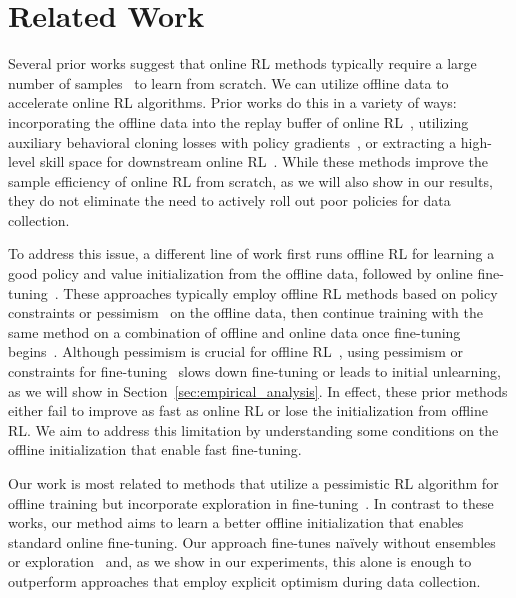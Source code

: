 \vspace{-0.2cm}
\section{Related Work}
\vspace{-0.3cm}
Several prior works suggest that online RL methods typically require a large number of samples~\cite{silver2016mastering,vinyals2019grandmaster,ye2020towards,kakade2002approximately,zhai2022computational,gupta2022unpacking,li2022understanding} to learn from scratch. We can utilize offline data to accelerate online RL algorithms. Prior works do this in a variety of ways: incorporating the offline data into the replay buffer of online RL~\cite{schaal1996learning,vecerik2017leveraging,hester2018deep,song2023hybrid}, utilizing auxiliary behavioral cloning losses with policy gradients~\cite{rajeswaran2017learning,kang2018policy,zhu2018reinforcement,zhu2019dexterous}, or extracting a high-level skill space for downstream online RL~\cite{gupta2019relay,ajay2020opal}. While these methods improve the sample efficiency of online RL from scratch, as we will also show in our results, they do not eliminate the need to actively roll out poor policies for data collection.

To address this issue, a different line of work first runs offline RL for learning a good policy and value initialization from the offline data, followed by online fine-tuning~\cite{nair2020accelerating,kostrikov2021offlineb,lyu2022mildly,beeson2022improving,wu2022supported,lee2022offline,mark2022fine}. These approaches typically employ offline RL methods based on policy constraints or pessimism~\cite{fujimoto2018off,siegel2020keep,guo2020batch,ghasemipour2021emaq,kostrikov2021offlineb,singh2020cog,lee2022offline} on the offline data, then continue training with the same method on a combination of offline and online data once fine-tuning begins~\cite{nachum2019algaedice,kidambi2020morel,yu2020mopo,kumar2020conservative,buckman2020importance}. Although pessimism is crucial for offline RL~\cite{jin2021pessimism,cheng2022adversarially}, using pessimism or constraints for fine-tuning~\cite{nair2020accelerating,kostrikov2021offlineb,lyu2022mildly} slows down fine-tuning or leads to initial unlearning, as we will show in Section~\ref{sec:empirical_analysis}. In effect, these prior methods either fail to improve as fast as online RL or lose the initialization from offline RL. We aim to address this limitation by understanding some conditions on the offline initialization that enable fast fine-tuning. 

Our work is most related to methods that utilize a pessimistic RL algorithm for offline training but incorporate exploration in fine-tuning~\cite{lee2022offline,mark2022fine,wu2022supported}. In contrast to these works, our method aims to learn a better offline initialization that enables standard online fine-tuning. Our approach fine-tunes na\"ively without ensembles~\cite{lee2022offline} or exploration~\cite{mark2022fine} and, as we show in our experiments, this alone is enough to outperform approaches that employ explicit optimism during data collection.